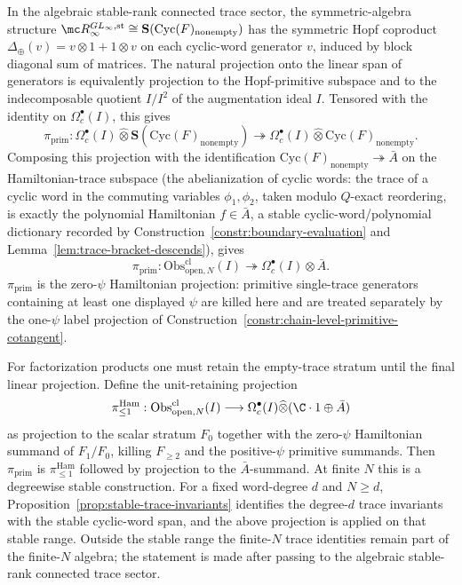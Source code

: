 \begin{constr}\label{constr:chain-level-primitive-projection}
  In the algebraic stable-rank connected trace sector, the
  symmetric-algebra structure
  $\mc R_\infty^{GL_\infty,\mathrm{st}}\cong
  \mathbf S(\mathrm{Cyc}(F)_{\mathrm{nonempty}})$ has the symmetric
  Hopf coproduct
  \(\Delta_\oplus(v)=v\otimes1+1\otimes v\) on each cyclic-word
  generator \(v\), induced by block diagonal sum of matrices.  The
  natural projection onto the linear span of generators is equivalently
  projection to the Hopf-primitive subspace and to the indecomposable
  quotient \(I/I^2\) of the augmentation ideal \(I\).  Tensored with the
  identity on
  $\Omega^\bullet_c(I)$, this gives
  $$\pi_{\mathrm{prim}}:
    \Omega^\bullet_c(I)\widehat\otimes\mathbf S(\mathrm{Cyc}(F)_{\mathrm{nonempty}})
    \twoheadrightarrow
    \Omega^\bullet_c(I)\widehat\otimes\mathrm{Cyc}(F)_{\mathrm{nonempty}}.$$
  Composing this projection with the identification
  $\mathrm{Cyc}(F)_{\mathrm{nonempty}}\twoheadrightarrow\bar A$ on the
  Hamiltonian-trace subspace
  (the abelianization of cyclic words: the trace of a cyclic word in
  the commuting variables $\phi_1,\phi_2$, taken modulo $Q$-exact
  reordering, is exactly the polynomial Hamiltonian
  $f\in\bar A$, a stable cyclic-word/polynomial dictionary recorded
  by Construction~\ref{constr:boundary-evaluation} and
  Lemma~\ref{lem:trace-bracket-descends}), gives
  $$\pi_{\mathrm{prim}}:
    \mathrm{Obs}^{\mathrm{cl}}_{\mathrm{open},N}(I)
    \twoheadrightarrow
    \Omega^\bullet_c(I)\widehat\otimes\bar A.$$
  $\pi_{\mathrm{prim}}$ is the zero-\(\psi\) Hamiltonian projection:
  primitive single-trace generators containing at least one displayed
  $\psi$ are killed here and are treated separately by the one-\(\psi\)
  label projection of Construction~\ref{constr:chain-level-primitive-cotangent}.

  For factorization products one must retain the empty-trace stratum until
  the final linear projection.  Define the unit-retaining projection
  $$\pi_{\leq1}^{\mathrm{Ham}}:
    \mathrm{Obs}^{\mathrm{cl}}_{\mathrm{open},N}(I)
    \longrightarrow
    \Omega^\bullet_c(I)\widehat\otimes(\C\cdot1\oplus\bar A)$$
  as projection to the scalar stratum \(F_0\) together with the
  zero-\(\psi\) Hamiltonian summand of \(F_1/F_0\), killing
	  \(F_{\ge2}\) and the positive-\(\psi\) primitive summands.  Then
	  \(\pi_{\mathrm{prim}}\) is
	  \(\pi_{\leq1}^{\mathrm{Ham}}\) followed by projection to the
	  \(\bar A\)-summand.
  At finite $N$ this is a degreewise stable construction.  For a fixed
  word-degree $d$ and $N\geq d$,
  Proposition~\ref{prop:stable-trace-invariants} identifies the
  degree-$d$ trace invariants with the stable cyclic-word span, and
  the above projection is applied on that stable range.  Outside the
  stable range the finite-$N$ trace identities remain part of the
  finite-\(N\) algebra; the statement is made after passing to the
  algebraic stable-rank connected trace sector.
\end{constr}

